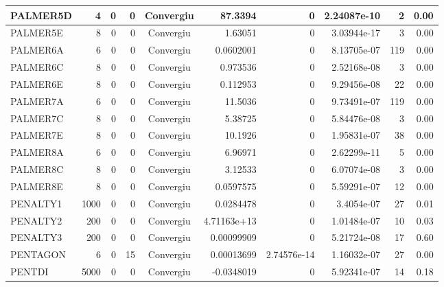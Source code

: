 \begin{center}
\begin{longtable}{|l|r|r|r|c|r|r|r|r|r|}
PALMER5D &      4 &      0 &      0 & Convergiu  &     87.3394 &              0 & 2.24087e-10 &      2 &    0.00 \\ \hline
PALMER5E &      8 &      0 &      0 & Convergiu  &     1.63051 &              0 & 3.03944e-17 &      3 &    0.00 \\ \hline
PALMER6A &      6 &      0 &      0 & Convergiu  &   0.0602001 &              0 & 8.13705e-07 &    119 &    0.00 \\ \hline
PALMER6C &      8 &      0 &      0 & Convergiu  &    0.973536 &              0 & 2.52168e-08 &      3 &    0.00 \\ \hline
PALMER6E &      8 &      0 &      0 & Convergiu  &    0.112953 &              0 & 9.29456e-08 &     22 &    0.00 \\ \hline
PALMER7A &      6 &      0 &      0 & Convergiu  &     11.5036 &              0 & 9.73491e-07 &    119 &    0.00 \\ \hline
PALMER7C &      8 &      0 &      0 & Convergiu  &     5.38725 &              0 & 5.84476e-08 &      3 &    0.00 \\ \hline
PALMER7E &      8 &      0 &      0 & Convergiu  &     10.1926 &              0 & 1.95831e-07 &     38 &    0.00 \\ \hline
PALMER8A &      6 &      0 &      0 & Convergiu  &     6.96971 &              0 & 2.62299e-11 &      5 &    0.00 \\ \hline
PALMER8C &      8 &      0 &      0 & Convergiu  &     3.12533 &              0 & 6.07074e-08 &      3 &    0.00 \\ \hline
PALMER8E &      8 &      0 &      0 & Convergiu  &   0.0597575 &              0 & 5.59291e-07 &     12 &    0.00 \\ \hline
PENALTY1 &   1000 &      0 &      0 & Convergiu  &   0.0284478 &              0 &  3.4054e-07 &     27 &    0.01 \\ \hline
PENALTY2 &    200 &      0 &      0 & Convergiu  & 4.71163e+13 &              0 & 1.01484e-07 &     10 &    0.03 \\ \hline
PENALTY3 &    200 &      0 &      0 & Convergiu  &  0.00099909 &              0 & 5.21724e-08 &     17 &    0.60 \\ \hline
PENTAGON &      6 &      0 &     15 & Convergiu  &  0.00013699 &    2.74576e-14 & 1.16032e-07 &     27 &    0.00 \\ \hline
  PENTDI &   5000 &      0 &      0 & Convergiu  &  -0.0348019 &              0 & 5.92341e-07 &     14 &    0.18 \\ \hline

\end{longtable}
\end{center}

